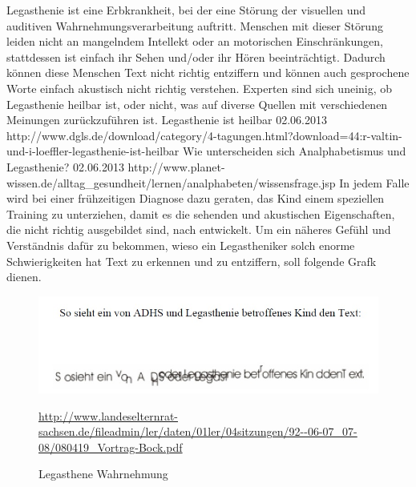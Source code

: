 Legasthenie ist eine Erbkrankheit, bei der eine Störung der visuellen und auditiven Wahrnehmungsverarbeitung auftritt. Menschen mit dieser Störung leiden nicht an mangelndem Intellekt oder an motorischen Einschränkungen, stattdessen ist einfach ihr Sehen und/oder ihr Hören beeinträchtigt. Dadurch können diese Menschen Text nicht richtig entziffern und können auch gesprochene Worte einfach akustisch nicht richtig verstehen. Experten sind sich uneinig, ob Legasthenie heilbar ist, oder nicht, was auf diverse Quellen mit verschiedenen Meinungen zurückzuführen ist.
				{Legasthenie ist heilbar}
				{02.06.2013}
				{http://www.dgls.de/download/category/4-tagungen.html?download=44:r-valtin-und-i-loeffler-legasthenie-ist-heilbar}
				{Wie unterscheiden sich Analphabetismus und Legasthenie?}
				{02.06.2013}
				{http://www.planet-wissen.de/alltag_gesundheit/lernen/analphabeten/wissensfrage.jsp}
 In jedem Falle wird bei einer frühzeitigen Diagnose dazu geraten, das Kind einem speziellen Training zu unterziehen, damit es die sehenden und akustischen Eigenschaften, die nicht richtig ausgebildet sind, nach entwickelt. Um ein näheres Gefühl und Verständnis dafür zu bekommen, wieso ein Legastheniker solch enorme Schwierigkeiten hat Text zu erkennen und zu entziffern, soll folgende Grafk dienen.\\

\begin{figure}[h]
	\centering
		\includegraphics[width=1.00\textwidth]{Daten/legastheneWahrnehmung.jpg}
	\caption{Legasthene Wahrnehmung}
	\url{http://www.landeselternrat-sachsen.de/fileadmin/ler/daten/01ler/04sitzungen/92--06-07_07-08/080419_Vortrag-Bock.pdf}
	\label{fig:legastheneWahrnehmung}
\end{figure}